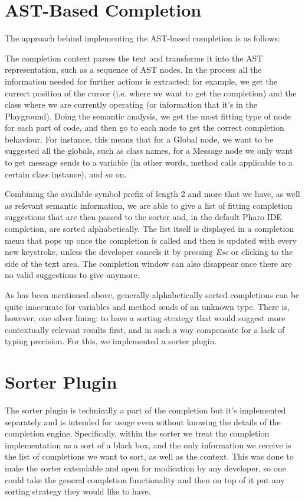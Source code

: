 \section{AST-Based Completion}
\label{sec:PharoCompletion-ASTCompletion}
The approach behind implementing the AST-based completion is as follows:

The completion context parses the text and transforms it into the AST representation, such as a sequence of AST nodes. In the process all the information needed for further actions is extracted: for example, we get the currect position of the cursor (i.e. where we want to get the completion) and the class where we are currently operating (or information that it's in the Playground). Doing the semantic analysis, we get the most fitting type of node for each part of code, and then go to each node to get the correct completion behaviour. For instance, this means that for a Global node, we want to be suggested all the globals, such as class names, for a Message node we only want to get message sends to a variable (in other words, method calls applicable to a certain class instance), and so on.

Combining the available symbol prefix of length 2 and more that we have, as well as relevant semantic information, we are able to give a list of fitting completion suggestions that are then passed to the sorter and, in the default Pharo IDE completion, are sorted alphabetically. The list itself is displayed in a completion menu that pops up once the completion is called and then is updated with every new keystroke, unless the developer cancels it by pressing \textit{Esc} or clicking to the side of the text area. The completion window can also disappear once there are no valid suggestions to give anymore.

As has been mentioned above, generally alphabetically sorted completions can be quite inaccurate for variables and method sends of an unknown type. There is, however, one silver lining: to have a sorting strategy that would suggest more contextually relevant results first, and in such a way compensate for a lack of typing precision. For this, we implemented a sorter plugin.

\section{Sorter Plugin}
\label{sec:PharoCompletion-SorterPlugin}
The sorter plugin is technically a part of the completion but it's implemented separately and is intended for usage even without knowing the details of the completion engine. Specifically, within the sorter we treat the completion implementation as a sort of a black box, and the only information we receive is the list of completions we want to sort, as well as the context. This was done to make the sorter extendable and open for modication by any developer, so one could take the general completion functionality and then on top of it put any sorting strategy they would like to have.

